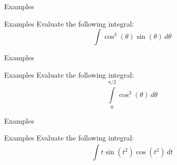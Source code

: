 \documentclass[presentation]{beamer}
\begin{document}
\begin{frame}[label={sec:orgaf53421}]{Examples}
\end{frame}

\begin{frame}[label={sec:orgf53df1a}]{Examples}
Evaluate the following integral:
\[
\int \cos^3 \left(  \theta \right) \sin \left( \theta \right)\,d\theta
\]
\vspace{10in}
\end{frame}

\begin{frame}[label={sec:org576e128}]{Examples}
\end{frame}

\begin{frame}[label={sec:orgb6a885f}]{Examples}
Evaluate the following integral:
\[
\int\limits_0^{\pi/2} \cos^3 \left( \theta \right)\,d\theta \]
\vspace{10in}
\end{frame}

\begin{frame}[label={sec:orga6d6867}]{Examples}
\end{frame}

\begin{frame}[label={sec:org4ec73ac}]{Examples}
Evaluate the following integral:
\[
\int\limits_{}^{} t \sin \left( t^2 \right)\cos \left( t^2 \right)\,dt
\]
\vspace{10in}
\end{frame}
\end{document}
